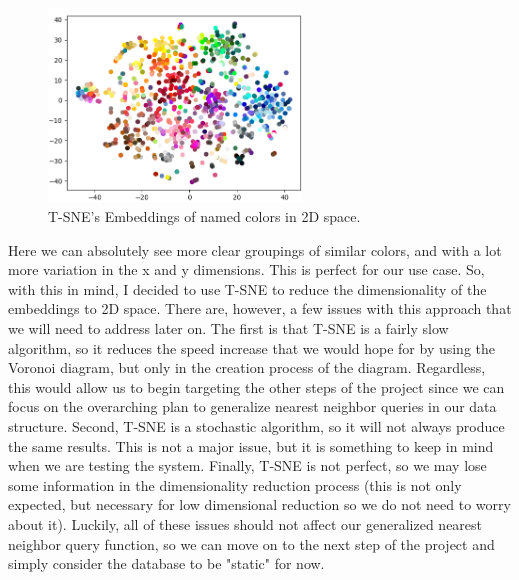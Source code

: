 \documentclass{article}
\begin{document}
\begin{figure}[H]
\centering
\includegraphics[width=0.6\textwidth]{images/tsne_2d_embeddings.png}
\caption{T-SNE's Embeddings of named colors in 2D space.}
\label{fig:tsne2dembeddings}
\end{figure}

\noindent
Here we can absolutely see more clear groupings of similar colors, and with a lot more variation
in the x and y dimensions. This is perfect for our use case. So, with this in mind, I decided to use
T-SNE to reduce the dimensionality of the embeddings to 2D space. There are, however, a few issues with this approach that we will need to address later on. The first
is that T-SNE is a fairly slow algorithm, so it reduces the speed increase that we would
hope for by using the Voronoi diagram, but only in the creation process of the diagram. Regardless, this would allow us to begin targeting
the other steps of the project since we can focus on the overarching plan to generalize
nearest neighbor queries in our data structure. Second, T-SNE is a stochastic algorithm, so
it will not always produce the same results. This is not a major issue, but it is something
to keep in mind when we are testing the system. Finally, T-SNE is not perfect, so we may
lose some information in the dimensionality reduction process (this is not only expected, but necessary for low dimensional reduction so we do not need to worry about it). Luckily, all of these issues
should not affect our generalized nearest neighbor query function, so we can move on to the
next step of the project and simply consider the database to be "static" for now. 
\end{document}
